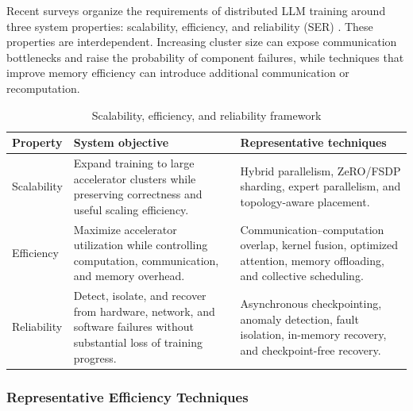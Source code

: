 \documentclass[11pt,journal,final, onecolumn]{IEEEtran}
\begin{document}
Recent surveys organize the requirements of distributed LLM training around
three system properties: scalability, efficiency, and reliability (SER)
\cite{duan2024efficienttraininglargelanguage}. These properties are
interdependent. Increasing cluster size can expose communication bottlenecks
and raise the probability of component failures, while techniques that improve
memory efficiency can introduce additional communication or recomputation.

\begin{table}[htbp]
    \centering
    \caption{Scalability, efficiency, and reliability framework}
    \label{tab:ser-framework}
    \small
    \renewcommand{\arraystretch}{1.25}
    \begin{tabularx}{\textwidth}{
            >{\raggedright\arraybackslash}p{}
            >{\raggedright\arraybackslash}X
            >{\raggedright\arraybackslash}p{}
        }
        \toprule
        \textbf{Property}
         & \textbf{System objective}
         & \textbf{Representative techniques}                                \\
        \midrule

        Scalability
         & Expand training to large accelerator clusters while preserving
        correctness and useful scaling efficiency.
         & Hybrid parallelism, ZeRO/FSDP sharding, expert parallelism, and
        topology-aware placement.                                            \\

        Efficiency
         & Maximize accelerator utilization while controlling computation,
        communication, and memory overhead.
         & Communication--computation overlap, kernel fusion, optimized
        attention, memory offloading, and collective scheduling.             \\

        Reliability
         & Detect, isolate, and recover from hardware, network, and software
        failures without substantial loss of training progress.
         & Asynchronous checkpointing, anomaly detection, fault isolation,
        in-memory recovery, and checkpoint-free recovery.                    \\

        \bottomrule
    \end{tabularx}
\end{table}

\subsubsection{Representative Efficiency Techniques}
\end{document}
